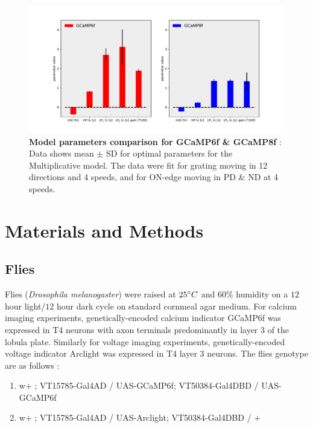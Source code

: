 \documentclass[9pt,lineno]{elife}
\begin{document}
\begin{figure}
\begin{fullwidth}
\includegraphics[width=0.84\linewidth]{figure6}
\caption{\textbf{Model parameters comparison for GCaMP6f \& GCaMP8f} : Data shows mean $\pm$ SD for optimal parameters for the Multiplicative model. The data were fit for grating moving in 12 directions and 4 speeds, and for ON-edge moving in PD \& ND at 4 speeds.}

\label{gcampcomparison}
	
\end{fullwidth}
\end{figure} 




\section{Materials and Methods}
\subsection{Flies}
Flies (\textit{Drosophila melanogaster}) were raised at $25\degree C$ and $60\%$ humidity on a $12$ hour light/$12$ hour dark cycle on standard cornmeal agar medium. For calcium imaging experiments, genetically-encoded calcium indicator GCaMP6f \parencite{Chen2013} was expressed in T4 neurons with axon terminals predominantly in  layer 3 of the lobula plate. Similarly for voltage imaging experiments, genetically-encoded voltage indicator Arclight \parencite{Jin2012} was expressed in T4 layer 3 neurons. The flies genotype are as follows : 
\begin{enumerate}
\item w+ ; VT15785-Gal4AD / UAS-GCaMP6f; VT50384-Gal4DBD / UAS-GCaMP6f 
\item w+ ; VT15785-Gal4AD / UAS-Arclight; VT50384-Gal4DBD / + 
\end{enumerate}
\end{document}

